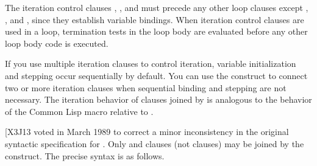 \begin{new}
The iteration control clauses , , and  
must precede any other loop clauses except
, , and ,
since they establish variable bindings.  When iteration control clauses are
used in a loop, termination tests in the loop body are evaluated
before any other loop body code is executed.

If you use multiple iteration clauses to control iteration, variable
initialization and stepping occur sequentially by default.  
You can use the  construct to connect two or more
iteration clauses when sequential binding and stepping are not necessary.
The iteration behavior of clauses joined by 
is analogous to the behavior of the Common Lisp macro 
relative to .

[X3J13 voted in March 1989  to correct a minor
inconsistency in the original syntactic specification for .  Only 
and  clauses (not  clauses) may be joined by the  construct. The
precise syntax is as follows.

\end{new}
